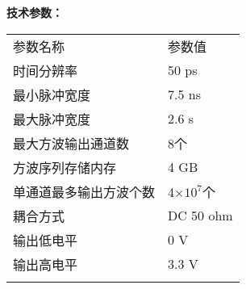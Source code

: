 \vspace{0.4cm}
\noindent\xiaosi\textbf{技术参数：}
\vspace{0.1cm}
\begin{table}[H]
{}
\begin{tabular}{m{6.5cm}|m{6.5cm}}
\rowcolor{myblue}
\color{white}参数名称& \color{white}参数值\\\arrayrulecolor{tabcolor}\midrule[1.2pt]
时间分辨率& 50 ps\\\arrayrulecolor{tabcolor}\midrule[1.2pt]
最小脉冲宽度& 7.5 ns \\\arrayrulecolor{tabcolor}\midrule[1.2pt]
最大脉冲宽度& 2.6 s\\\arrayrulecolor{tabcolor}\midrule[1.2pt]
最大方波输出通道数& 8个\\\arrayrulecolor{tabcolor}\midrule[1.2pt]
方波序列存储内存& 4 GB\\\arrayrulecolor{tabcolor}\midrule[1.2pt]
单通道最多输出方波个数&  4×$10^{7}$个\\\midrule[1.2pt]
耦合方式& DC 50 ohm\\\arrayrulecolor{tabcolor}\midrule[1.2pt]
输出低电平& 0 V\\\arrayrulecolor{tabcolor}\midrule[1.2pt]
输出高电平& 3.3 V\\\arrayrulecolor{tabcolor}\midrule[1.2pt]
\end{tabular}
\end{table}



